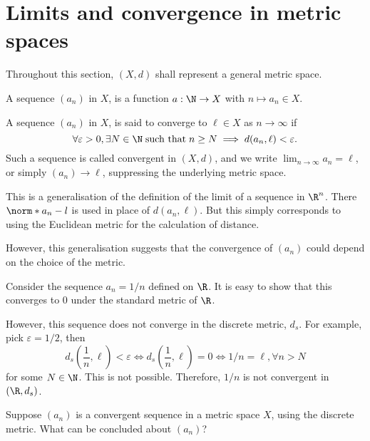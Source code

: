 \documentclass[draft]{penrose}
\begin{document}
\section{Limits and convergence in metric spaces}
Throughout this section, $(X,d)$ shall represent a general metric space.

\begin{ndfn}
  A sequence $(a_n)$ in $X$, is a function $a:\N \to X$ with $n \mapsto a_n \in X$.
\end{ndfn}

\begin{ndfn}
  A sequence $(a_n)$ in $X$, is said to converge to $\ell \in X$ as $n \to \infty$ if
  \begin{equation*}
    \forall \varepsilon > 0, \exists N \in \N\;\text{such that}\;n \geq N \implies d(a_n, \ell) < \varepsilon.
  \end{equation*}
  Such a sequence is called convergent in $(X,d)$, and we write $\lim_{n\to\infty} a_n = \ell$, or simply $(a_n) \to \ell$, suppressing the underlying metric space.
\end{ndfn}

This is a generalisation of the definition of the limit of a sequence in $\R^n$. There $\norm*{a_n - l}$ is used in place of $d(a_n, \ell)$. But this simply corresponds to using the Euclidean metric for the calculation of distance.

However, this generalisation suggests that the convergence of $(a_n)$ could depend on the choice of the metric.
\begin{negg}
  Consider the sequence $a_n = 1/n$ defined on $\R$. It is easy to show that this converges to $0$ under the standard metric of $\R$.

  However, this sequence does not converge in the discrete metric, $d_s$. For example, pick $\varepsilon = 1/2$, then
  \begin{equation*}
    d_s\left(\frac{1}{n},\ell\right) < \varepsilon \iff d_s\left(\frac{1}{n},\ell\right) = 0 \iff 1/n = \ell, \forall n>N
  \end{equation*}
  for some $N \in \N$. This is not possible. Therefore, $1/n$ is not convergent in $(\R, d_s)$.
\end{negg}

\begin{nex}
  Suppose $(a_n)$ is a convergent sequence in a metric space $X$, using the discrete metric. What can be concluded about $(a_n)$?
\end{nex}
\end{document}
